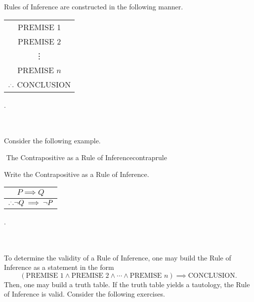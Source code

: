         Rules of Inference are constructed in the following manner.
        \begin{center}
            \begin{tabular}{c}
                \hline
                PREMISE 1 \\
                PREMISE 2 \\
                \vdots \\
                PREMISE \(n\) \\
                \hline
                \(.^..\) CONCLUSION \\
                \hline 
            \end{tabular}.
        \end{center}
        \vphantom
        \\
        \\
        Consider the following example.
        \begin{example}{\Difficulty\,\,The Contrapositive as a Rule of Inference}{contraprule}
        
            Write the Contrapositive as a Rule of Inference.
            \begin{center}
                \begin{tabular}{c}
                    \hline
                    \(P \implies Q\) \\
                    \hline
                    \(.^.. \neg Q\implies \neg P\) \\
                    \hline 
                \end{tabular}.
            \end{center}
            
        \end{example}
        \vphantom
        \\
        \\
        To determine the validity of a Rule of Inference, one may build the Rule of Inference as a statement in the form
        \begin{equation*}
            (\text{PREMISE 1} \wedge \text{PREMISE 2} \wedge \cdots \wedge \text{PREMISE } n) \implies \text{CONCLUSION.}
        \end{equation*}
        Then, one may build a truth table. If the truth table yields a tautology, the Rule of Inference is valid. Consider the following exercises.
